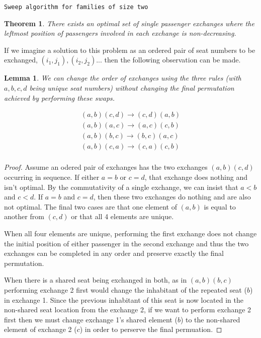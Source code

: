 \documentclass[a4paper]{article}
\newtheorem{thm}{Theorem}[section]
\newtheorem{lem}{Lemma}[section]
\begin{document}
\begin{algorithm}
\label{alg:twoSweep}
\caption{ \texttt{Sweep algorithm for families of size two} }
\end{algorithm}
\FloatBarrier

\begin{thm} \label{thm:sweepCorrectness}
There exists an optimal set of single passenger exchanges where the leftmost position of passengers involved in each exchange is non-decreasing.
\end{thm}


If we imagine a solution to this problem as an ordered pair of seat numbers to be exchanged, $(i_1,j_1), (i_2,j_2)...$ then the following observation can be made. 

\begin{lem} \label{lem:swapRules} 
We can change the order of exchanges using the three rules (with $a,b,c,d$ being unique seat numbers) without changing the final permutation achieved by performing these swaps.

\begin{eqnarray*}
(a,b) (c,d) \rightarrow (c,d) (a,b) \\
(a,b) (a,c) \rightarrow (a,c) (c,b) \\
(a,b) (b,c) \rightarrow (b,c) (a,c) \\
(a,b) (c,a) \rightarrow (c,a) (c,b) \\
\end{eqnarray*}
\end{lem}

\begin{proof}
Assume an odered pair of exchanges has the two exchanges $(a,b) (c,d)$ occurring in sequence. If either $a=b$ or $c=d$, that exchange does nothing and isn't optimal.  By the commutativity of a single exchange, we can insist that $a<b$ and $c<d$.  If $a=b$ and $c=d$, then these two exchanges do nothing and are also not optimal.  The final two cases are that one element of $(a,b)$ is equal to another from $(c,d)$ or that all 4 elements are unique.

When all four elements are unique, performing the first exchange does not change the initial position of either passenger in the second exchange and thus the two exchanges can be completed in any order and preserve exactly the final permutation.

When there is a shared seat being exchanged in both, as in $(a,b) (b,c)$ performing exchange 2 first would change the inhabitant of the repeated seat ($b$) in exchange 1.  Since the previous inhabitant of this seat is now located in the non-shared seat location from the exchange 2, if we want to perform exchange 2 first then we must change exchange 1's shared element ($b$) to the non-shared element of exchange 2 ($c$) in order to perserve the final permuation.
\end{proof}
\end{document}
